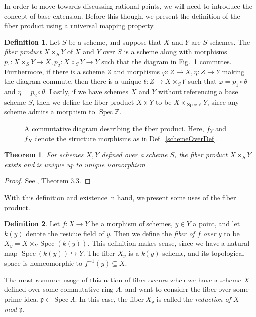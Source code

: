 \documentclass[12pt,twoside]{reedthesis}
\theoremstyle{plain}
\newtheorem{theorem}{Theorem}[chapter]
\theoremstyle{definition}
\newtheorem{definition}{Definition}[section]
\theoremstyle{remark}
\newcommand{\ZZ}{\mathbb{Z}}
\newcommand{\Spec}{\operatorname{Spec}}
\begin{document}
In order to move towards discussing rational points, we will need to introduce the concept of base extension. Before this though, we present the definition of the fiber product using a universal mapping property.
\begin{definition}
Let $S$ be a scheme, and suppose that $X$ and $Y$ are $S$-schemes. The \emph{fiber product} $X\times_S Y$ of $X$ and $Y$ over $S$ is a scheme along with morphisms $p_1:X\times_S Y\to X, p_2:X\times_S Y\to Y$ such that the diagram in Fig.~\ref{fibDiag} commutes. Furthermore, if there is a scheme $Z$ and morphisms $\varphi:Z\to X, \eta:Z\to Y$ making the diagram commute, then there is a unique $\theta:Z\to X\times_S Y$ such that $\varphi=p_1\circ\theta$ and $\eta=p_2\circ\theta$. Lastly, if we have schemes $X$ and $Y$ without referencing a base scheme $S$, then we define the fiber product $X\times Y$ to be $X\times_{\Spec\ZZ} Y$, since any scheme admits a morphism to $\Spec\ZZ$.
\begin{figure}
\centering
{}
\caption{A commutative diagram describing the fiber product. Here, $f_Y$ and $f_X$ denote the structure morphisms as in Def.~\ref{schemeOverDef}.}
\label{fibDiag}
\end{figure}
\end{definition}
\begin{theorem}
For schemes $X,Y$ defined over a scheme $S$, the fiber product $X\times_S Y$ exists and is unique up to unique isomorphism
\end{theorem}
\begin{proof}
See \cite{hartshorne}, Theorem 3.3.
\end{proof}
With this definition and existence in hand, we present some uses of the fiber product.
\begin{definition}
Let $f:X\to Y$ be a morphism of schemes, $y\in Y$ a point, and let $k(y)$ denote the residue field of $y$. Then we define the \emph{fiber of $f$ over $y$} to be $X_y=X\times_Y\Spec(k(y))$. This definition makes sense, since we have a natural map $\Spec(k(y))\hookrightarrow Y$. The fiber $X_y$ is a $k(y)$-scheme, and its topological space is homeomorphic to $f^{-1}(y)\subseteq X$.
\end{definition}
\noindent The most common usage of this notion of fiber occurs when we have a scheme $X$ defined over some commutative ring $A$, and want to consider the fiber over some prime ideal $\mathfrak{p}\in\Spec A$. In this case, the fiber $X_\mathfrak{p}$ is called the \emph{reduction of $X$ mod $\mathfrak{p}$}. 
\end{document}
